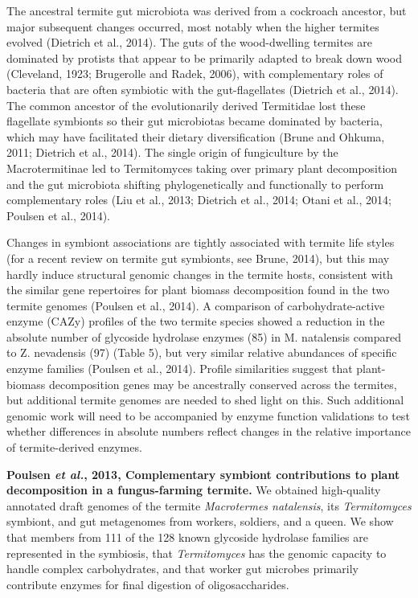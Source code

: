 \documentclass[11pt]{article}
\begin{document}
\begin{sloppypar}
The ancestral termite gut microbiota was derived from a cockroach ancestor, but major subsequent changes occurred, most notably when the higher termites evolved (Dietrich et al., 2014). The guts of the wood-dwelling termites are dominated by protists that appear to be primarily adapted to break down wood (Cleveland, 1923; Brugerolle and Radek, 2006), with complementary roles of bacteria that are often symbiotic with the gut-flagellates (Dietrich et al., 2014). The common ancestor of the evolutionarily derived Termitidae lost these flagellate symbionts so their gut microbiotas became dominated by bacteria, which may have facilitated their dietary diversification (Brune and Ohkuma, 2011; Dietrich et al., 2014). The single origin of fungiculture by the Macrotermitinae led to Termitomyces taking over primary plant decomposition and the gut microbiota shifting phylogenetically and functionally to perform complementary roles (Liu et al., 2013; Dietrich et al., 2014; Otani et al., 2014; Poulsen et al., 2014).
\par
Changes in symbiont associations are tightly associated with termite life styles (for a recent review on termite gut symbionts, see Brune, 2014), but this may hardly induce structural genomic changes in the termite hosts, consistent with the similar gene repertoires for plant biomass decomposition found in the two termite genomes (Poulsen et al., 2014). A comparison of carbohydrate-active enzyme (CAZy) profiles of the two termite species showed a reduction in the absolute number of glycoside hydrolase enzymes (85) in M. natalensis compared to Z. nevadensis (97) (Table 5), but very similar relative abundances of specific enzyme families (Poulsen et al., 2014). Profile similarities suggest that plant-biomass decomposition genes may be ancestrally conserved across the termites, but additional termite genomes are needed to shed light on this. Such additional genomic work will need to be accompanied by enzyme function validations to test whether differences in absolute numbers reflect changes in the relative importance of termite-derived enzymes.
\par
\textbf{Poulsen \textit{et al.}, 2013, Complementary symbiont contributions to plant decomposition in a fungus-farming termite.} \newline
We obtained high-quality annotated draft genomes of the termite \textit{Macrotermes natalensis}, its \textit{Termitomyces} symbiont, and gut metagenomes from workers, soldiers, and a queen. 
We show that members from 111 of the 128 known glycoside hydrolase families are represented in the symbiosis, that \textit{Termitomyces} has the genomic capacity to handle complex carbohydrates, and that worker gut microbes primarily contribute enzymes for final digestion of oligosaccharides. 

\end{sloppypar}
\end{document}
